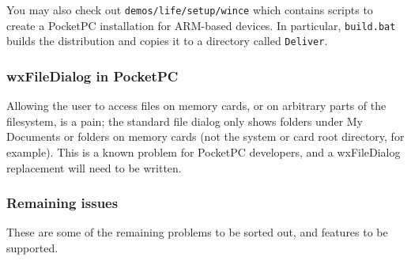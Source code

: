 You may also check out {\tt demos/life/setup/wince} which contains
scripts to create a PocketPC installation for ARM-based
devices. In particular, {\tt build.bat} builds the distribution and
copies it to a directory called {\tt Deliver}.

\subsubsection{wxFileDialog in PocketPC}

Allowing the user to access files on memory cards, or on arbitrary
parts of the filesystem, is a pain; the standard file dialog only
shows folders under My Documents or folders on memory cards
(not the system or card root directory, for example). This is
a known problem for PocketPC developers, and a wxFileDialog
replacement will need to be written.

\subsubsection{Remaining issues}

These are some of the remaining problems to be sorted out, and features
to be supported.

